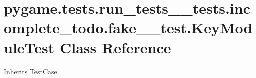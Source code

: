\hypertarget{classpygame_1_1tests_1_1run__tests____tests_1_1incomplete__todo_1_1fake__3__test_1_1_key_module_test}{}\section{pygame.\+tests.\+run\+\_\+tests\+\_\+\+\_\+tests.\+incomplete\+\_\+todo.\+fake\+\_\+\_\+test.\+Key\+Module\+Test Class Reference}
\label{classpygame_1_1tests_1_1run__tests____tests_1_1incomplete__todo_1_1fake__3__test_1_1_key_module_test}


Inherits Test\+Case.

